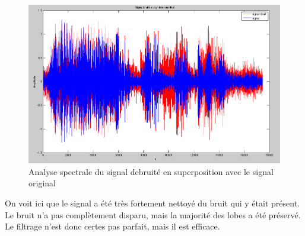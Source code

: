 \documentclass[a4paper, oneside]{report}
\begin{document}
 \begin{figure}[h]
 \centering
 \includegraphics[scale=0.42]{images/signal_reconstitue.png}
 \caption{Analyse spectrale du signal  debruit\'e en superposition avec le signal original}
 \end{figure}

On voit ici que le signal a \'et\'e tr\`es fortement nettoy\'e du bruit qui y \'etait pr\'esent. Le bruit n'a pas compl\`etement disparu, mais la majorit\'e des lobes a \'et\'e pr\'eserv\'e. Le filtrage n'est donc certes pas parfait, mais il est efficace.
\end{document}
